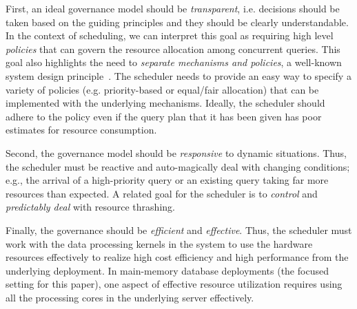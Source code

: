 First, an ideal governance model should be \textit{transparent}, i.e. decisions should be taken based on the guiding principles and they should be clearly understandable.
In the context of scheduling, we can interpret this goal as requiring high level \textit{policies} that can govern the resource allocation among concurrent queries. 
This goal also highlights the need to \textit{separate mechanisms and policies}, a well-known system design principle~\cite{LampsonS76}.
The scheduler needs to provide an easy way to specify a variety of policies (e.g. priority-based or equal/fair allocation) that can be implemented with the underlying mechanisms.
Ideally, the scheduler should adhere to the policy even if the query plan that it has been given has poor estimates for resource consumption.

Second, the governance model should be \textit{responsive} to dynamic situations. 
Thus, the scheduler must be reactive and auto-magically deal with changing conditions; e.g., the arrival of a high-priority query or an existing query taking far more resources than expected. 
A related goal for the scheduler is to \textit{control} and \textit{predictably deal} with resource thrashing.

Finally, the governance should be \textit{efficient} and \textit{effective}. 
Thus, the scheduler must work with the data processing kernels in the system to use the hardware resources effectively to realize high cost efficiency and high performance from the underlying deployment. 
In main-memory database deployments (the focused setting for this paper), one aspect of effective resource utilization requires using all the processing cores in the underlying server effectively. 

